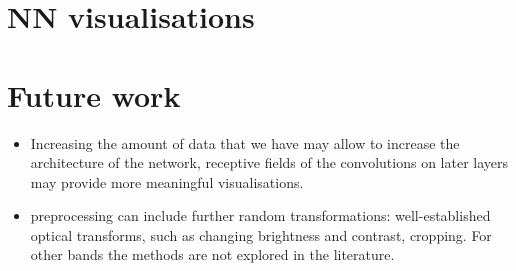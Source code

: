 \documentclass[11pt,a4paper]{article}
\begin{document}
\section{NN visualisations}

\section{Future work}
\begin{itemize}
\item Increasing the amount of data that we have may allow to increase the architecture of the network, receptive
fields of the convolutions on later layers may provide more meaningful visualisations.
\item preprocessing can include further random transformations: well-established optical transforms, such as changing
brightness and contrast, cropping. For other bands the methods are not explored in the literature.
\end{itemize}
\printbibliography
\end{document}
